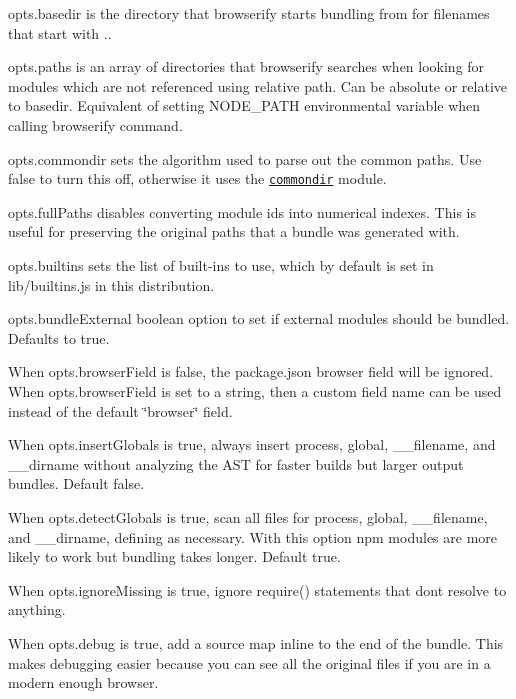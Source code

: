 {\ttfamily opts.\+basedir} is the directory that browserify starts bundling from for filenames that start with {\ttfamily .}.

{\ttfamily opts.\+paths} is an array of directories that browserify searches when looking for modules which are not referenced using relative path. Can be absolute or relative to {\ttfamily basedir}. Equivalent of setting {\ttfamily N\+O\+D\+E\+\_\+\+P\+A\+TH} environmental variable when calling {\ttfamily browserify} command.

{\ttfamily opts.\+commondir} sets the algorithm used to parse out the common paths. Use {\ttfamily false} to turn this off, otherwise it uses the \href{https://www.npmjs.com/package/commondir}{\tt commondir} module.

{\ttfamily opts.\+full\+Paths} disables converting module ids into numerical indexes. This is useful for preserving the original paths that a bundle was generated with.

{\ttfamily opts.\+builtins} sets the list of built-\/ins to use, which by default is set in {\ttfamily lib/builtins.\+js} in this distribution.

{\ttfamily opts.\+bundle\+External} boolean option to set if external modules should be bundled. Defaults to true.

When {\ttfamily opts.\+browser\+Field} is false, the package.\+json browser field will be ignored. When {\ttfamily opts.\+browser\+Field} is set to a {\ttfamily string}, then a custom field name can be used instead of the default {\ttfamily \char`\"{}browser\char`\"{}} field.

When {\ttfamily opts.\+insert\+Globals} is true, always insert {\ttfamily process}, {\ttfamily global}, {\ttfamily \+\_\+\+\_\+filename}, and {\ttfamily \+\_\+\+\_\+dirname} without analyzing the A\+ST for faster builds but larger output bundles. Default false.

When {\ttfamily opts.\+detect\+Globals} is true, scan all files for {\ttfamily process}, {\ttfamily global}, {\ttfamily \+\_\+\+\_\+filename}, and {\ttfamily \+\_\+\+\_\+dirname}, defining as necessary. With this option npm modules are more likely to work but bundling takes longer. Default true.

When {\ttfamily opts.\+ignore\+Missing} is true, ignore {\ttfamily require()} statements that don\textquotesingle{}t resolve to anything.

When {\ttfamily opts.\+debug} is true, add a source map inline to the end of the bundle. This makes debugging easier because you can see all the original files if you are in a modern enough browser.

